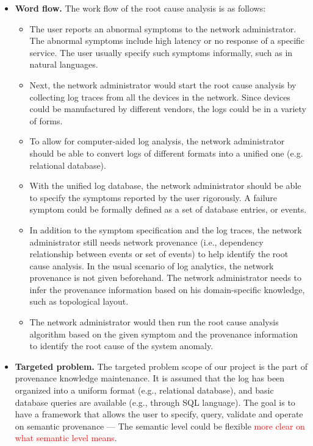 \documentclass{article}
\begin{document}
\begin{itemize}
\item {\bf Word flow.} The work flow of the root cause analysis is as follows:
  \begin{itemize}
  \item The user reports an abnormal symptoms to the network administrator. The
  abnormal symptoms include high latency or no response of a specific
  service. The user usually specify such symptoms informally, such as in natural
  languages.
  \item Next, the network administrator would start the root cause analysis by
  collecting log traces from all the devices in the network. Since devices could
  be manufactured by different vendors, the logs could be in a variety of forms.
  \item To allow for computer-aided log analysis, the network administrator should
  be able to convert logs of different formats into a unified one
  (e.g. relational database).
  \item With the unified log database, the network administrator should be
  able to specify the symptoms reported by the user rigorously. A failure symptom
  could be formally defined as a set of database entries, or events. 
  \item In addition to the symptom specification and the log traces, the network
  administrator still needs network provenance (i.e., dependency relationship
  between events or set of events) to help identify the root cause
  analysis. In the usual scenario of log analytics, the network provenance is not
  given beforehand. The network administrator needs to infer the provenance
  information based on his domain-specific knowledge, such as topological
  layout.
  \item The network administrator would then run the root cause analysis algorithm
  based on the given symptom and the provenance information to identify the root
  cause of the system anomaly. 
  \end{itemize}

\item {\bf Targeted problem.}
  The targeted problem scope of our project is the part of provenance knowledge
  maintenance. It is assumed that the log has been organized into a uniform format
  (e.g., relational database), and basic database queries are available (e.g.,
  through SQL language). The goal is to have a framework that allows the user to
  specify, query, validate and operate on semantic provenance --- The semantic level could
  be flexible \textcolor{red}{more clear on what semantic level means}.


\end{itemize}
\end{document}
